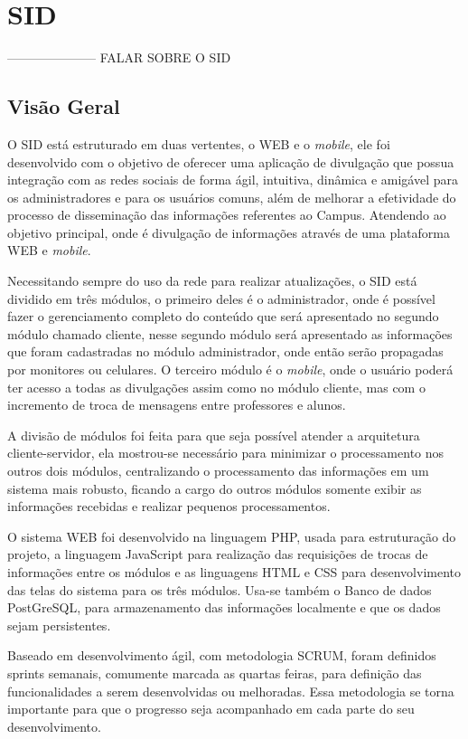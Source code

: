 \chapter[SID]{SID}
--------------------- FALAR SOBRE O SID

\section{Visão Geral}
O SID está estruturado em duas vertentes, o WEB e o \textit{mobile}, ele foi desenvolvido com o objetivo de oferecer uma aplicação de divulgação que possua integração com as redes sociais de forma ágil, intuitiva, dinâmica e amigável para os administradores e para os usuários comuns, além de melhorar a efetividade do processo de disseminação das informações referentes ao Campus. Atendendo ao objetivo principal, onde é divulgação de informações através de uma plataforma WEB e \textit{mobile}.

Necessitando sempre do uso da rede para realizar atualizações, o SID está dividido em três módulos, o primeiro deles é o administrador, onde é possível fazer o gerenciamento completo do conteúdo que será apresentado no segundo módulo chamado cliente, nesse segundo módulo será apresentado as informações que foram cadastradas no módulo administrador, onde então serão propagadas por monitores ou celulares. O terceiro módulo é o \textit{mobile}, onde o usuário poderá ter acesso a todas as divulgações assim como no módulo cliente, mas com o incremento de troca de mensagens entre professores e alunos. 

A divisão de módulos foi feita para que seja possível atender a arquitetura cliente-servidor, ela mostrou-se necessário para minimizar o processamento nos outros dois módulos, centralizando o processamento das informações em um sistema mais robusto, ficando a cargo do outros módulos somente exibir as informações recebidas e realizar pequenos processamentos.

O sistema WEB foi desenvolvido na linguagem PHP, usada para estruturação do projeto, a linguagem JavaScript para realização das requisições de trocas de informações entre os módulos e as linguagens HTML e CSS para desenvolvimento das telas do sistema para os três módulos. Usa-se também o Banco de dados PostGreSQL, para armazenamento das informações localmente e que os dados sejam persistentes.

Baseado em desenvolvimento ágil, com metodologia SCRUM, foram definidos sprints semanais, comumente marcada as quartas feiras, para definição das funcionalidades a serem desenvolvidas ou melhoradas. Essa metodologia se torna importante para que o progresso seja acompanhado em cada parte do seu desenvolvimento.

